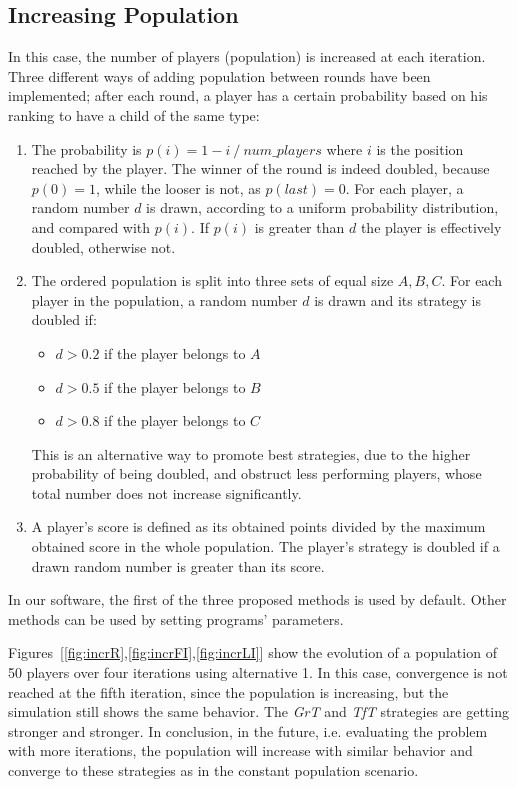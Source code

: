 \documentclass[journal,10pt,twoside]{IEEEtran}
\begin{document}
\subsection{Increasing Population} \label{ss:rIPDMPi}
In this case, the number of players (population) is increased at each iteration. Three different ways of adding population between rounds have been implemented; after each round, a player has a certain probability based on his ranking to have a child of the same type:
\begin{enumerate}
    \item The probability is $p(i)=1- i\ /\ num\_players$ where $i$ is the position reached by the player. The winner of the round is indeed doubled, because $p(0)=1$, while the looser is not, as $p(last)=0$.
    For each player, a random number $d$ is drawn, according to a uniform probability distribution, and compared with $p(i)$. If $p(i)$ is greater than $d$ the player is effectively doubled, otherwise not.
    \item The ordered population is split into three sets of equal size $A,B,C$. For each player in the population, a random number $d$ is drawn and its strategy is doubled if:
    \begin{itemize}
        \item $d>0.2$ if the player belongs to $A$
        \item $d>0.5$ if the player belongs to $B$
        \item $d>0.8$ if the player belongs to $C$
    \end{itemize}
    This is an alternative way to promote best strategies, due to the higher probability of being doubled, and obstruct less performing players, whose total number does not increase significantly.
    \item A player's score is defined as its obtained points divided by the maximum obtained score in the whole population. The player's strategy is doubled if a drawn random number is greater than its score.
\end{enumerate}

In our software, the first of the three proposed methods is used by default. Other methods can be used by setting programs' parameters.

Figures~[\ref{fig:incrR},\ref{fig:incrFI},\ref{fig:incrLI}] show the evolution of a population of 50 players over four iterations using alternative 1. In this case, convergence is not reached at the fifth iteration, since the population is increasing, but the simulation still shows the same behavior. The \textit{GrT} and \textit{TfT} strategies are getting stronger and stronger. In conclusion, in the future, i.e. evaluating the problem with more iterations, the population will increase with similar behavior and converge to these strategies as in the constant population scenario.
\end{document}
